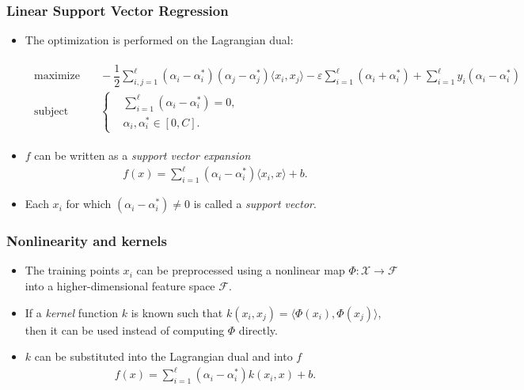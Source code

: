 \documentclass{beamer}
\begin{document}
\begin{frame}
\frametitle{Linear Support Vector Regression}
\begin{itemize}
\item The optimization is performed on the Lagrangian dual:
\begin{scriptsize}
\begin{align*}
\begin{aligned}
\text{maximize} &\quad
-\dfrac{1}{2}\sum_{i,j=1}^{\ell}(\alpha_{i} - \alpha_{i}^{*})(\alpha_{j} - \alpha_{j}^{*})\langle x_{i},x_{j} \rangle -\varepsilon\sum_{i=1}^{\ell}(\alpha_{i} + \alpha_{i}^{*}) + \sum_{i=1}^{\ell}y_{i}(\alpha_{i}-\alpha_{i}^{*}) \\
\text{subject to} &\quad \left\{\begin{aligned}
&\sum_{i=1}^{\ell}(\alpha_{i} - \alpha_{i}^{*}) = 0 \text{,}\\
&\alpha_{i},\alpha_{i}^{*} \in [0,C] \text{.}
\end{aligned}\right.
\end{aligned}
\end{align*}
\end{scriptsize}
\item $ f $ can be written as a \textit{support vector expansion}
\begin{align*}
f(x) = \sum_{i=1}^{\ell}(\alpha_{i}-\alpha_{i}^{*})\langle x_{i},x\rangle + b \text{.}
\end{align*}
\item Each $ x_{i} $ for which $ (\alpha_{i}-\alpha_{i}^{*}) \neq 0 $ is called a \textit{support vector}.
\end{itemize}
\end{frame}


\begin{frame}
\frametitle{Nonlinearity and kernels}
\begin{itemize}
\item The training points $ x_{i} $ can be preprocessed using a nonlinear map $ \Phi : \mathcal{X} \rightarrow \mathcal{F} $ into a higher-dimensional feature space $ \mathcal{F} $.
\item If a \textit{kernel} function $ k $ is known such that $ k(x_{i},x_{j}) = \langle\Phi (x_{i}),\Phi (x_{j})\rangle $, then it can be used instead of computing $ \Phi $ directly.
\item $k$ can be substituted into the Lagrangian dual and into $f$
\begin{align*}
f(x) = \sum_{i=1}^{\ell}(\alpha_{i}-\alpha_{i}^{*})k(x_{i},x) + b \text{.}
\end{align*}
\end{itemize}
\end{frame}
\end{document}
